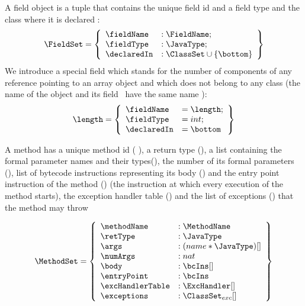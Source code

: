  A field object is a tuple that contains the unique field id and a field type and the class where it is declared :  
 $$ \begin{array}{l}
                                     \FieldSet = \left\{\begin{array}{ll}  \fieldName  &  : \FieldName;\\
                                                                          \fieldType   &  : \JavaType; \\
									  \declaredIn  &  : \ClassSet \cup \{ \bottom \}
                     \end{array} \right\}
   \end{array} $$
 We introduce a special field which stands for the number of components of any reference pointing to an array object and which does not belong to any class
 (the name of the object and its field  \fieldName \ have the same name ):
 $$  \length =  \left\{\begin{array}{ll} \fieldName & = \length;\\
			                 \fieldType  & = int; \\
					 \declaredIn & = \bottom
                     \end{array} \right\}$$
 

 A method has a unique method id ( \methodName), a return type (\retType),
 a list containing the formal parameter names and their types(\args), 
 the number of its formal parameters (\numArgs),
 list of bytecode instructions representing its body (\body)
 and the entry point instruction of the method (\entryPoint)
 (the instruction at which every execution of the method starts), 
 the exception handler table (\excHandlerTable) and the list of exceptions
 (\exceptions) that the method may throw

 $$ \begin{array}{l} %
                     \MethodSet  = \left\{\begin{array}{ll}  \methodName & :\MethodName\\
						          \retType & :\JavaType\\
							  \args &  : (name * \JavaType) [] \\
							  \numArgs & : nat \\
							  \body &  : \bcIns [] \\
							  \entryPoint  &  : \bcIns \\
							  \excHandlerTable & : \ExcHandler []\\
							  \exceptions & : \ClassSet_{exc}[]
                                     \end{array}  \right\}
     \end{array} $$
  

